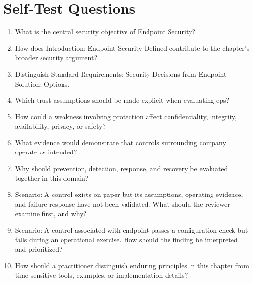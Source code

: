 \documentclass[11pt]{article}
\begin{document}
\section*{Self-Test Questions}
\begin{enumerate}
\item What is the central security objective of Endpoint Security?
\item How does Introduction: Endpoint Security Defined contribute to the chapter's broader security argument?
\item Distinguish Standard Requirements: Security Decisions from Endpoint Solution: Options.
\item Which trust assumptions should be made explicit when evaluating eps?
\item How could a weakness involving protection affect confidentiality, integrity, availability, privacy, or safety?
\item What evidence would demonstrate that controls surrounding company operate as intended?
\item Why should prevention, detection, response, and recovery be evaluated together in this domain?
\item Scenario: A control exists on paper but its assumptions, operating evidence, and failure response have not been validated. What should the reviewer examine first, and why?
\item Scenario: A control associated with endpoint passes a configuration check but fails during an operational exercise. How should the finding be interpreted and prioritized?
\item How should a practitioner distinguish enduring principles in this chapter from time-sensitive tools, examples, or implementation details?
\end{enumerate}
\end{document}
